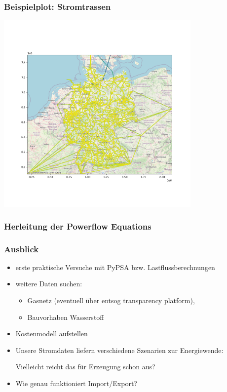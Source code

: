 \documentclass[aspectratio=169,t]{beamer}
\begin{document}
	\begin{frame}
		\frametitle{Beispielplot: Stromtrassen}
		\vspace*{-1.3cm}
		\hspace*{6cm}
		\includegraphics[height=10cm]{./line.png}
	\end{frame}

	\begin{frame}
		\frametitle{Herleitung der Powerflow Equations}
		
	\end{frame}
	
	

	
	
	\begin{frame}
		\frametitle{Ausblick}
		
		\vspace*{6mm}
		\begin{itemize}
			\item erste praktische Versuche mit PyPSA bzw. Lastflussberechnungen
			\item weitere Daten suchen:
			\begin{itemize}
				\item Gasnetz (eventuell über entsog transparency platform),
				\item Bauvorhaben Wasserstoff
			\end{itemize}
			\item Kostenmodell aufstellen
			\item Unsere Stromdaten liefern verschiedene Szenarien zur Energiewende:
			
			Vielleicht reicht das für Erzeugung schon aus? 
			\item Wie genau funktioniert Import/Export?
		\end{itemize}
			
		
	\end{frame}
	
	
	
	
	
	
	
\end{document}
